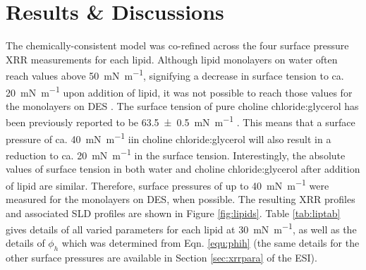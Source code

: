 \documentclass[amsmath,amssymb,twocolumn,superscriptaddress]{revtex4-1}
\begin{document}
\section{Results \& Discussions}
%
The chemically-consistent model was co-refined across the four surface pressure XRR measurements for each lipid.
Although lipid monolayers on water often reach values above \SI{50}{\milli\newton\per\meter}, signifying a decrease in surface tension to ca. \SI{20}{\milli\newton\per\meter} upon addition of lipid, it was not possible to reach those values for the monolayers on DES \cite{mohwald_phospholipid_1990}.
The surface tension of pure choline chloride:glycerol has been previously reported to be \SI{63.5\pm0.5}{\milli\newton\per\meter} \cite{sanchez-fernandez_micellization_2016}.
This means that a surface pressure of ca. \SI{40}{\milli\newton\per\meter} iin choline chloride:glycerol will also result in a reduction to ca. \SI{20}{\milli\newton\per\meter} in the surface tension.
Interestingly, the absolute values of surface tension in both water and choline chloride:glycerol after addition of lipid are similar.
Therefore, surface pressures of up to \SI{40}{\milli\newton\per\meter} were measured for the monolayers on DES, when possible.
The resulting XRR profiles and associated SLD profiles are shown in Figure \ref{fig:lipids}.
Table \ref{tab:liptab} gives details of all varied parameters for each lipid at \SI{30}{\milli\newton\per\meter}, as well as the details of $\phi_h$ which was determined from Eqn. \ref{equ:phih} (the same details for the other surface pressures are available in Section \ref{sec:xrrpara} of the ESI).
%
\end{document}
